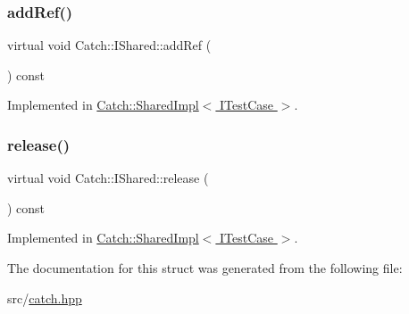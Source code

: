 \subsubsection{\texorpdfstring{add\+Ref()}{addRef()}}
{\footnotesize\ttfamily virtual void Catch\+::\+I\+Shared\+::add\+Ref (\begin{DoxyParamCaption}{ }\end{DoxyParamCaption}) const\hspace{0.3cm}{\ttfamily [pure virtual]}}



Implemented in \hyperlink{struct_catch_1_1_shared_impl_a5d1a4c96e8fc07c821890fd09749062e}{Catch\+::\+Shared\+Impl$<$ I\+Test\+Case $>$}.

\mbox{\label{struct_catch_1_1_i_shared_a002f52624728a763956fb6f230cb2f57}} 
\subsubsection{\texorpdfstring{release()}{release()}}
{\footnotesize\ttfamily virtual void Catch\+::\+I\+Shared\+::release (\begin{DoxyParamCaption}{ }\end{DoxyParamCaption}) const\hspace{0.3cm}{\ttfamily [pure virtual]}}



Implemented in \hyperlink{struct_catch_1_1_shared_impl_ada8052c6f24fd73ec099333626f106fe}{Catch\+::\+Shared\+Impl$<$ I\+Test\+Case $>$}.



The documentation for this struct was generated from the following file\+:\begin{DoxyCompactItemize}
\item 
src/\hyperlink{catch_8hpp}{catch.\+hpp}\end{DoxyCompactItemize}

